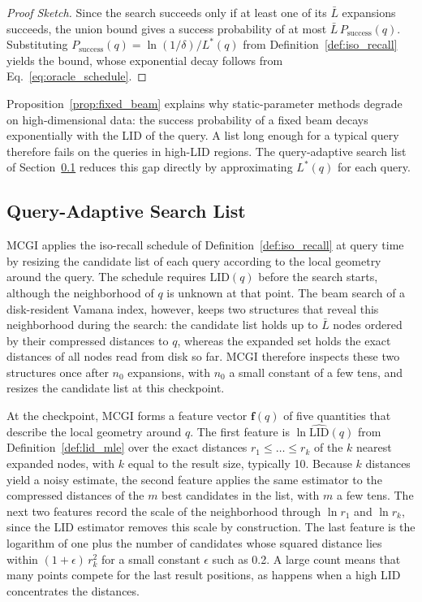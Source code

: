 \documentclass{article}
\theoremstyle{plain}
\theoremstyle{definition}
\theoremstyle{remark}
\newcommand{\ours}{MCGI\xspace}
\begin{document}
\begin{proof}[Proof Sketch]
Since the search succeeds only if at least one of its $\bar{L}$ expansions succeeds, the union bound gives a success probability of at most $\bar{L}\, P_{\mathrm{success}}(q)$. Substituting $P_{\mathrm{success}}(q) = \ln(1/\delta)/L^*(q)$ from Definition~\ref{def:iso_recall} yields the bound, whose exponential decay follows from Eq.~\eqref{eq:oracle_schedule}.
\end{proof}

Proposition~\ref{prop:fixed_beam} explains why static-parameter
methods degrade on high-dimensional data: the success probability of
a fixed beam decays exponentially with the LID of the query. A list
long enough for a typical query therefore fails on the queries in
high-LID regions. The query-adaptive search list of Section~\ref{subsec:query_adaptive} reduces this gap directly by approximating $L^*(q)$ for each query.



\subsection{Query-Adaptive Search List}
\label{subsec:query_adaptive}

\ours{} applies the iso-recall schedule of Definition~\ref{def:iso_recall} at query time by resizing the candidate list of each query according to the local geometry around the query. The schedule requires $\mathrm{LID}(q)$ before the search starts, although the neighborhood of $q$ is unknown at that point. The beam search of a disk-resident Vamana index, however, keeps two structures that reveal this neighborhood during the search: the candidate list holds up to $\bar{L}$ nodes ordered by their compressed distances to $q$, whereas the expanded set holds the exact distances of all nodes read from disk so far. \ours{} therefore inspects these two structures once after $n_0$ expansions, with $n_0$ a small constant of a few tens, and resizes the candidate list at this checkpoint.

At the checkpoint, \ours{} forms a feature vector $\mathbf{f}(q)$ of five quantities that describe the local geometry around $q$. The first feature is $\ln \widehat{\mathrm{LID}}(q)$ from Definition~\ref{def:lid_mle} over the exact distances $r_1 \le \dots \le r_k$ of the $k$ nearest expanded nodes, with $k$ equal to the result size, typically 10. Because $k$ distances yield a noisy estimate, the second feature applies the same estimator to the compressed distances of the $m$ best candidates in the list, with $m$ a few tens. The next two features record the scale of the neighborhood through $\ln r_1$ and $\ln r_k$, since the LID estimator removes this scale by construction. The last feature is the logarithm of one plus the number of candidates whose squared distance lies within $(1+\epsilon)\, r_k^2$ for a small constant $\epsilon$ such as 0.2. A large count means that many points compete for the last result positions, as happens when a high LID concentrates the distances.
\end{document}
